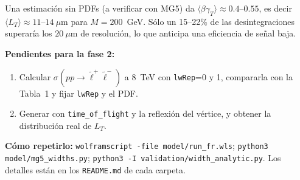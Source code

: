 \documentclass[11pt,a4paper]{article}
\newcommand{\lt}{\tilde{\ell}}
\begin{document}
Una estimación sin PDFs (a verificar con MG5) da $\langle\beta\gamma_T\rangle\approx0.4$--$0.55$, es decir $\langle L_T\rangle\approx11$--$14~\mu$m para $M=200$~GeV. Sólo un 15--22\% de las desintegraciones superaría los $20~\mu$m de resolución, lo que anticipa una eficiencia de señal baja.

\textbf{Pendientes para la fase 2:}
\begin{enumerate}
\item Calcular $\sigma(pp\to\lt^+\lt^-)$ a 8~TeV con \texttt{lwRep}=0 y 1, compararla con la Tabla~1 y fijar \texttt{lwRep} y el PDF.
\item Generar con \texttt{time\_of\_flight} y la reflexión del vértice, y obtener la distribución real de $L_T$.
\end{enumerate}

\vspace{6pt}
\noindent\textbf{Cómo repetirlo:} \texttt{wolframscript -file model/run\_fr.wls}; \texttt{python3 model/mg5\_widths.py}; \texttt{python3 -I validation/width\_analytic.py}. Los detalles están en los \texttt{README.md} de cada carpeta.
\end{document}
